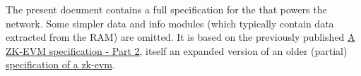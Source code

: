 The present document contains a full specification for the \zkEvm{} that powers the \linea{} network. Some simpler data and info modules (which typically contain data extracted from the RAM) are omitted. It is based on the previously published \href{https://ethresear.ch/t/a-zk-evm-specification-part-2/13903}{A ZK-EVM specification - Part 2}, itself an expanded version of an older (partial) \href{https://ethresear.ch/t/a-zk-evm-specification/11549}{specification of a zk-evm}.
